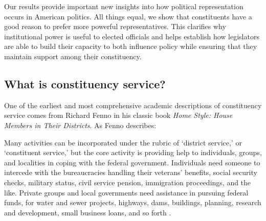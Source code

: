\documentclass{article}
\begin{document}
Our results provide important new insights into how political representation occurs in American politics.  All things equal, we show that constituents have a good reason to prefer more powerful representatives. This clarifies why institutional power is useful to elected officials and helps establish how legislators are able to build their capacity to both influence policy while ensuring that they maintain support among their constituency. 

\subsection{What is constituency service?}

One of the earliest and most comprehensive academic descriptions of constituency service comes from Richard Fenno in his classic book \emph{Home Style: House Members in Their Districts}. As Fenno describes:

\begin{displayquote}
Many activities can be incorporated under the rubric of `district service,' or `constituent service,' but the core activity is providing help to individuals, groups, and localities in coping with the federal government.  Individuals need someone to intercede with the bureaucracies handling their veterans' benefits, social security checks, military status, civil service pension, immigration proceedings, and the like.  Private groups and local governments need assistance in pursuing federal funds, for water and sewer projects, highways, dams, buildings, planning, research and development, small business loans, and so forth \citep[pg. 101]{Fenno1978}.
\end{displayquote}
\end{document}
